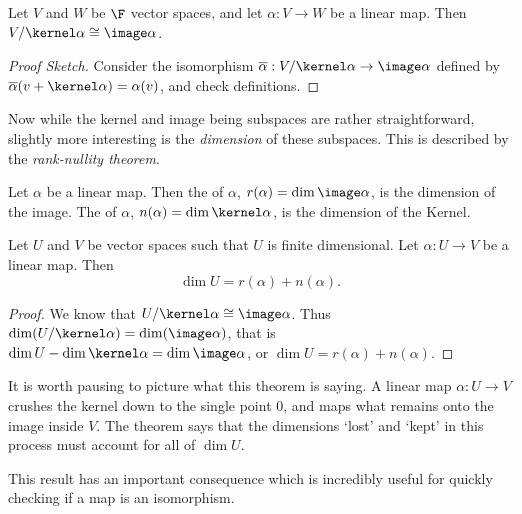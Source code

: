 \begin{theorem}
    Let $V$ and $W$ be $\F$ vector spaces, and let $\alpha: V \rightarrow W$ be a linear map. Then $V/\kernel \alpha \cong \image \alpha$.
\end{theorem}
\begin{proof}[Proof Sketch]
    Consider the isomorphism $\overline{\alpha} : V/\kernel \alpha \rightarrow \image \alpha$ defined by $\overline{\alpha}(v + \kernel \alpha) = \alpha(v)$, and check definitions.
\end{proof}

Now while the kernel and image being subspaces are rather straightforward, slightly more interesting is the \emph{dimension} of these subspaces. This is described by the \emph{rank-nullity theorem}.

\begin{definition}
    Let $\alpha$ be a linear map. Then the  of $\alpha$, $r(\alpha) = \dim \image \alpha$, is the dimension of the image. The  of $\alpha$, $n(\alpha) = \dim \kernel \alpha$, is the dimension of the Kernel.
\end{definition}

\begin{theorem}
    Let $U$ and $V$ be vector spaces such that $U$ is finite dimensional.
    Let $\alpha: U \rightarrow V$ be a linear map. Then
    $$
    \dim U = r(\alpha) + n(\alpha).
    $$
\end{theorem}
\begin{proof}
    We know that $U/\kernel \alpha \cong \image \alpha$. Thus $\dim (U / \kernel \alpha) = \dim (\image \alpha)$, that is $\dim U - \dim \kernel \alpha = \dim \image \alpha$, or $\dim U = r(\alpha) + n(\alpha)$.
\end{proof}

It is worth pausing to picture what this theorem is saying. A linear map $\alpha: U \rightarrow V$ crushes the kernel down to the single point $0$, and maps what remains onto the image inside $V$. The theorem says that the dimensions `lost' and `kept' in this process must account for all of $\dim U$.
\begin{center}
\end{center}
This result has an important consequence which is incredibly useful for quickly checking if a map is an isomorphism.

